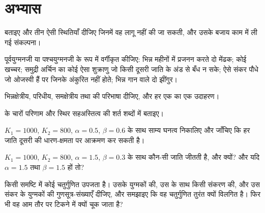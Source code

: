 \section{अभ्यास}

\begin{exercise}[$\star$]\label{exo:b2:speciation:1}
 बताइए और तीन ऐसी स्थितियाँ दीजिए जिनमें
वह लागू नहीं की जा सकती, और उसके बजाय काम में ली गई संकल्पना।
\end{exercise}

\begin{exercise}[$\star$]\label{exo:b2:speciation:2}
पूर्वयुग्मनजी या पश्चयुग्मनजी के रूप में वर्गीकृत कीजिए: भिन्न महीनों में
प्रजनन करते दो मेंढक; कोई खच्चर; समुद्री अर्चिन का कोई ऐसा शुक्राणु जो
किसी दूसरी जाति के अंड से बँध न सके; ऐसे संकर पौधे जो ओजस्वी हैं पर जिनके
 अंकुरित नहीं होते; भिन्न गान वाले दो झींगुर।
\end{exercise}

\begin{exercise}[$\star$]\label{exo:b2:speciation:3}
भिन्नक्षेत्रीय, परिधीय, समक्षेत्रीय तथा  की
परिभाषा दीजिए, और हर एक का एक उदाहरण।
\end{exercise}

\begin{exercise}[$\star$]\label{exo:b2:speciation:4}
 के चारों परिणाम और स्थिर सहअस्तित्व की
शर्त शब्दों में बताइए।
\end{exercise}

\begin{exercise}[$\star\star$]\label{exo:b2:speciation:5}
$K_1 = 1000$, $K_2 = 800$, $\alpha = 0.5$, $\beta = 0.6$ के साथ
साम्य घनत्व निकालिए और जाँचिए कि हर जाति दूसरी की धारण-क्षमता पर
आक्रमण कर सकती है।
\end{exercise}

\begin{exercise}[$\star\star$]\label{exo:b2:speciation:6}
$K_1 = 1000$, $K_2 = 800$, $\alpha = 1.5$, $\beta = 0.3$ के साथ कौन-सी
जाति जीतती है, और क्यों? और यदि $\alpha = 1.5$ तथा $\beta = 1.5$ हों तो?
\end{exercise}

\begin{exercise}[$\star\star$]\label{exo:b2:speciation:7}
किसी  समष्टि में कोई चतुर्गुणित उपजता है। उसके युग्मकों की, उस
 के साथ किसी संकरण की, और उस संकर के युग्मकों की गुणसूत्र-संख्याएँ
दीजिए, और समझाइए कि वह चतुर्गुणित तुरंत क्यों विलगित है। फिर भी वह आम तौर पर
टिकने में क्यों चूक जाता है?
\end{exercise}

